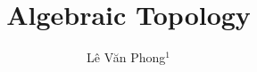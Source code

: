\setcounter{page}{1}


\centerline{}
\centerline{}

\title[AT]{Algebraic Topology}

\author[]{Lê Văn Phong$^1$}

\address{$^{1}$ Faculty of Mathematics – Mechanics – Informatics, University of Science, Vietnam National University, Hanoi.}
\email{\textcolor[rgb]{0.00,0.00,0.84}{lvphong.imath@gmail.com}}

\maketitle